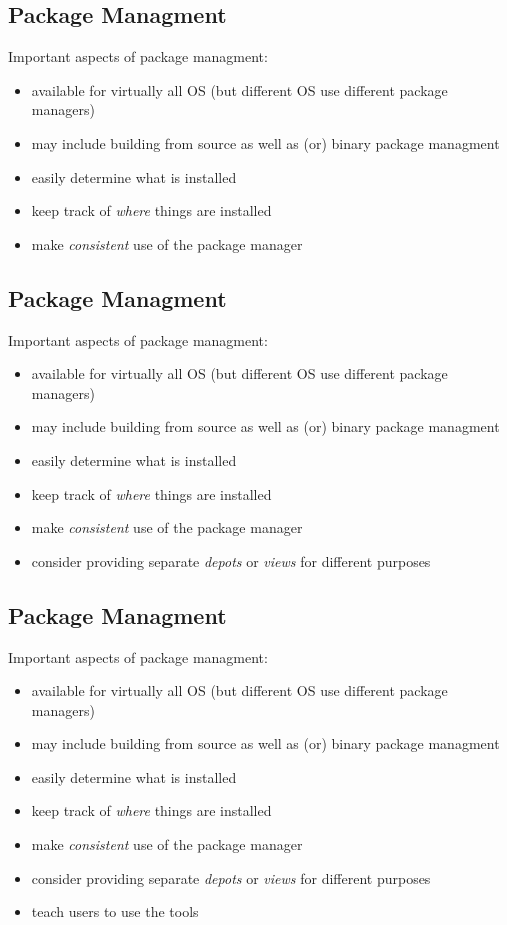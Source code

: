 \documentclass[xga]{xdvislides}
\begin{document}
\subsection{Package Managment}
Important aspects of package managment:
\begin{itemize}
	\item available for virtually all OS (but different OS use
		different package managers)
	\item may include building from source as well as (or) binary package
		managment
	\item easily determine what is installed
	\item keep track of {\em where} things are installed
	\item make {\em consistent} use of the package manager
\end{itemize}

\subsection{Package Managment}
Important aspects of package managment:
\begin{itemize}
	\item available for virtually all OS (but different OS use
		different package managers)
	\item may include building from source as well as (or) binary package
		managment
	\item easily determine what is installed
	\item keep track of {\em where} things are installed
	\item make {\em consistent} use of the package manager
	\item consider providing separate {\em depots} or {\em views} for
		different purposes
\end{itemize}

\subsection{Package Managment}
Important aspects of package managment:
\begin{itemize}
	\item available for virtually all OS (but different OS use
		different package managers)
	\item may include building from source as well as (or) binary package
		managment
	\item easily determine what is installed
	\item keep track of {\em where} things are installed
	\item make {\em consistent} use of the package manager
	\item consider providing separate {\em depots} or {\em views} for
		different purposes
	\item teach users to use the tools
\end{itemize}
\end{document}
